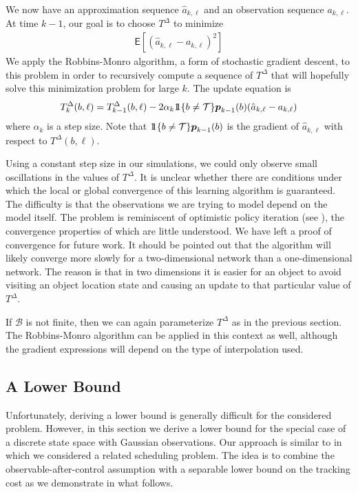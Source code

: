 \documentclass[journal,draftcls,onecolumn,11pt]{IEEEtran}
\newcommand{\emb}[1]{\text{\boldmath{$#1$}}}
\newcommand{\Expect}{\textsf{E}}
\newcommand{\indic}[1]{\mbox{$1\!\!1$}{\{#1\}}}
\newcommand{\term}{\mathcal{T}}
\begin{document}
We now have an approximation sequence $\hat{a}_{k,\ell}$ and an observation sequence $a_{k,\ell}$. At time $k-1$, our goal is to choose $T^\Delta$ to minimize
\begin{align}
   \Expect\left[ ( \hat{a}_{k,\ell} - a_{k,\ell} )^2 \right]
\end{align}
We apply the Robbins-Monro algorithm, a form of stochastic gradient descent, to this problem in order to recursively compute a sequence of $T^\Delta$ that will hopefully solve this minimization problem for large $k$.  The update equation is
\begin{align}
   T^\Delta_k(b,\ell) = T^\Delta_{k-1}(b,\ell) - 2 \alpha_k \indic{b \neq \term} \emb{p}_{k-1}(b) (\hat{a}_{k,\ell} - a_{k,\ell} )
\end{align}
where $\alpha_k$ is a step size.  Note that $\indic{b \neq \term} \emb{p}_{k-1}(b)$ is the gradient of $\hat{a}_{k,\ell}$ with respect to $T^\Delta(b,\ell)$.

Using a constant step size in our simulations, we could only observe small oscillations in the values of $T^\Delta$. It is unclear whether there are conditions under which the local or global convergence of this learning algorithm is guaranteed.  The difficulty is that the observations we are trying to model depend on the model itself.  The problem is reminiscent of optimistic policy iteration (see \cite{bertsekas07}), the convergence properties of which are little understood.  We have left a proof of convergence for future work.  It should be pointed out that the algorithm will likely converge more slowly for a two-dimensional network than a one-dimensional network.  The reason is that in two dimensions it is easier for an object to avoid visiting an object location state and causing an update to that particular value of $T^\Delta$.

If $\mathcal{B}$ is not finite, then we can again parameterize $T^\Delta$ as in the previous section.  The Robbins-Monro algorithm can be applied in this context as well, although the gradient expressions will depend on the type of interpolation used.

\subsection{A Lower Bound}
\label{sec:lower_bound}
Unfortunately, deriving a lower bound is generally difficult for the considered problem. However, in this section we derive a lower bound for the special case of a discrete state space with Gaussian observations. Our approach is similar to \cite{tsp_scheduling} in which we considered a related scheduling problem. The idea is to combine the observable-after-control assumption with a separable lower bound on the tracking cost as we demonstrate in what follows.
\end{document}
